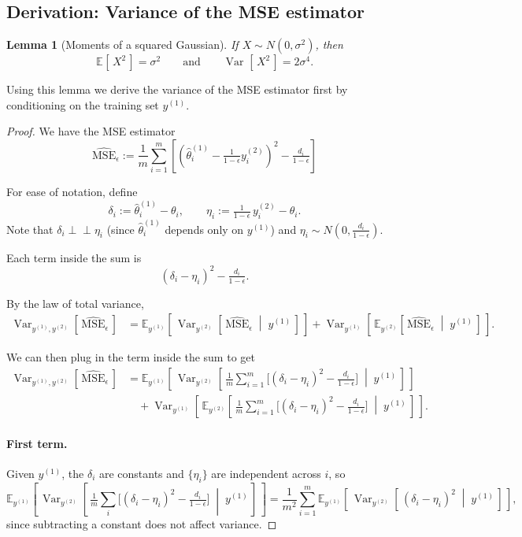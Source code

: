 \documentclass[11pt]{article}
\newcommand{\indep}{\perp\!\!\!\!\perp}
\newcommand{\agiven}{\;\middle|\;}  %
\newcommand{\thetatrain}{\hat{\theta}^{(1)}}           %
\newcommand{\ytrain}{y^{(1)}}                           %
\newcommand{\ytest}{y^{(2)}}                            %
\newcommand{\msehat}{\widehat{\mathrm{MSE}}_{\epsilon}}
\newcommand{\E}[2][]{\mathbb{E}_{#1}\!\left[\,#2\,\right]}
\newcommand{\Var}[2][]{\operatorname{Var}_{#1}\!\left[\,#2\,\right]}
\newcommand{\Varthin}[1]{\Var[\ytrain, \ytest]{#1}}
\newcommand{\N}[2]{N\!\left(#1, #2\right)}
\theoremstyle{plain}
\newtheorem{lemma}[theorem]{Lemma}       %
\theoremstyle{definition}
\theoremstyle{remark}
\begin{document}

\subsection{Derivation: Variance of the MSE estimator} \label{app:var_deriv}
\begin{lemma}[Moments of a squared Gaussian]\label{lem:sqnorm}
If $X \sim N(0,\sigma^2)$, then
\[
  \E{X^2} = \sigma^2
  \qquad \text{and} \qquad
  \Var{X^2} = 2\sigma^4.
\]
\end{lemma}

Using this lemma we derive the variance of the MSE estimator first by conditioning on the training set $\ytrain$.
\begin{proof}
We have the MSE estimator
\[
\msehat
:= \frac{1}{m}\sum_{i=1}^m
\left[
\left( \thetatrain_i - \tfrac{1}{1-\epsilon}\ytest_i \right)^{\!2}
- \tfrac{d_i}{1-\epsilon}
\right]
\]

For ease of notation, define
\[
  \delta_i := \thetatrain_i - \theta_i,
  \qquad
  \eta_i := \tfrac{1}{1-\epsilon}\,\ytest_i - \theta_i.
\]
Note that $\delta_i \indep \eta_i$ (since $\thetatrain_i$ depends only on $\ytrain$) and $\eta_i \sim \N{0}{\tfrac{d_i}{1-\epsilon}}$.

Each term inside the sum is
\[
(\delta_i - \eta_i)^2 - \tfrac{d_i}{1-\epsilon}.
\]

By the law of total variance,
\begin{align*}
\Varthin{\msehat}
&= \E[\ytrain]{ \Var[\ytest]{ \msehat \agiven \ytrain} }
 + \Var[\ytrain]{ \E[\ytest]{\msehat \agiven \ytrain } }.
\end{align*}

We can then plug in the term inside the sum to get
\begin{align*}
\Varthin{\msehat}
&= \E[\ytrain]{ \Var[\ytest]{ \tfrac{1}{m}\sum_{i=1}^m \big[(\delta_i-\eta_i)^2 - \tfrac{d_i}{1-\epsilon}\big] \agiven \ytrain } }\\
&\quad + \Var[\ytrain]{ \E[\ytest]{ \tfrac{1}{m}\sum_{i=1}^m \big[(\delta_i-\eta_i)^2 - \tfrac{d_i}{1-\epsilon}\big] \agiven \ytrain } }.
\end{align*}

\paragraph{First term.}
Given $\ytrain$, the $\delta_i$ are constants and $\{\eta_i\}$ are independent across $i$, so
\[
\E[\ytrain]{ \Var[\ytest]{ \tfrac{1}{m}\sum_i \big[(\delta_i-\eta_i)^2 - \tfrac{d_i}{1-\epsilon}\big] \agiven \ytrain } }
= \frac{1}{m^2}\sum_{i=1}^m \E[\ytrain]{ \Var[\ytest]{ (\delta_i-\eta_i)^2 \agiven \ytrain } },
\]
since subtracting a constant does not affect variance.


\end{proof}
\end{document}
